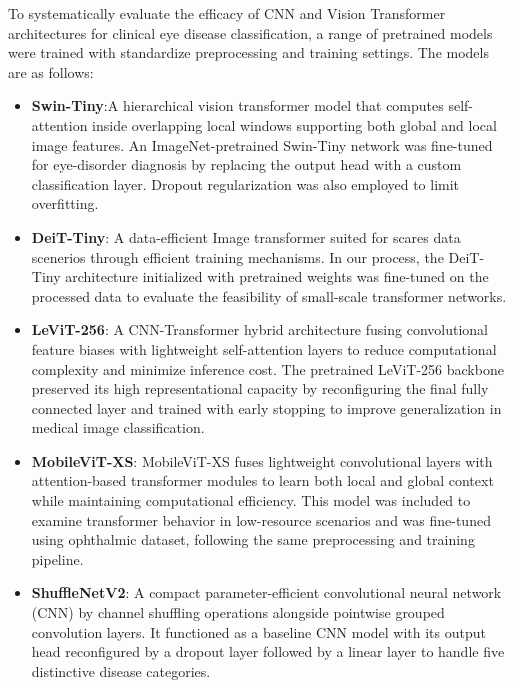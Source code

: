 \documentclass[conference,9pt]{IEEEtran}
\begin{document}
To systematically evaluate the efficacy of CNN \cite{resnet} and Vision Transformer architectures \cite{vit,swin,mobilevit,levit}  for clinical eye disease classification, a range of pretrained models were trained with standardize preprocessing and training settings. The models are as follows:

\begin{itemize}
    \item \textbf{Swin-Tiny}:A hierarchical vision transformer model that computes self-attention inside overlapping local windows supporting both global and local image features. An ImageNet-pretrained Swin-Tiny network was fine-tuned for eye-disorder diagnosis by replacing the output head with a custom classification layer. Dropout regularization was also employed to limit overfitting.

    \item \textbf{DeiT-Tiny}: A data-efficient Image transformer suited for scares data scenerios through efficient training mechanisms. In our process, the DeiT-Tiny architecture initialized with pretrained weights was fine-tuned on the processed data to evaluate the feasibility of small-scale transformer networks.

    \item \textbf{LeViT-256}: A CNN-Transformer hybrid architecture fusing convolutional feature biases with lightweight self-attention layers to reduce computational complexity and minimize inference cost. The pretrained LeViT-256 backbone preserved its high representational capacity by reconfiguring the final fully connected layer and trained with early stopping to improve generalization in medical image classification.

    \item \textbf{MobileViT-XS}: MobileViT-XS fuses lightweight convolutional layers with attention-based transformer modules to learn both local and global context while maintaining computational efficiency. This model was included to examine transformer behavior in low-resource scenarios and was fine-tuned using ophthalmic dataset, following the same preprocessing and training pipeline. 

    \item \textbf{ShuffleNetV2}: A compact parameter-efficient convolutional neural network (CNN) by channel shuffling operations alongside pointwise grouped convolution layers. It functioned as a baseline CNN model with its output head reconfigured by a dropout layer followed by a linear layer to handle five distinctive disease categories.
\end{itemize}
\end{document}
